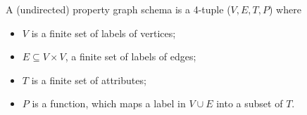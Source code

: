 

\begin{definition} 
A (undirected) property graph schema is a 4-tuple ($V, E, T, P$) where 

\begin{itemize}[noitemsep,topsep=0pt]
  \item $V$ is a ﬁnite set of labels of vertices;
  \item $E \subseteq V \times V$, a finite set of labels of edges; 
  \item $T$ is a ﬁnite set of attributes;
  \item $P$ is a function, which maps a label in $V \cup E$ into a subset of $T$.
\end{itemize}
  
\end{definition} 




 


